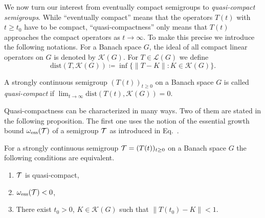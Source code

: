 We now turn our interest from eventually compact semigroups to \emph{quasi-compact semigroups}.
While \enquote{eventually compact} means that the operators $T(t)$ with $t \geq t_{0}$ have to be compact, \enquote{quasi-compactness} only
means that $T(t)$ approaches the compact operators as $t \to \infty$.
To make this precise we introduce the following notations.
For a Banach space $G$, the ideal of all compact linear operators on $G$ is denoted by $\mathcal{K}(G)$.
For $T \in \mathcal{L}(G)$ we define
%
\[
	\text{dist}(T,\mathcal{K}(G))  \coloneq  \inf\{\|T - K\| \colon K \in \mathcal{K}(G)\} .
\]
\begin{definition}\label{def:b4-2.7}
	A strongly continuous semigroup $(T(t))_{t \geq 0}$ on a Banach
	space $G$ is called \emph{quasi-compact} if\/ $\lim_{t\to\infty}\text{dist}(T(t),\mathcal{K}(G)) = 0$.
\end{definition}
Quasi-compactness can be characterized in many ways.
Two of them are stated in the following proposition.
The first one uses the notion of the essential growth bound $\omega_{\text{ess}}(\mathcal{T})$ of a semigroup $\mathcal{T}$ as introduced in Eq.~. 
\begin{proposition}\label{prop:b4-2.8}
	For a strongly continuous semigroup $\TT = (T(t))_{t \geq 0}$
	on a Banach space $G$ the following conditions are equivalent.
	\begin{enumerate}[\upshape (a)]
		\item
		$\mathcal{T}$ is quasi-compact,
	
		\item 
		$\omega_{\text{ess}}(\mathcal{T}) < 0$,
	
		\item 
		There exist $t_{0} > 0$, $K \in \mathcal{K}(G)$ such that $\|T(t_{0}) - K\| < 1$.
	\end{enumerate}
\end{proposition}
